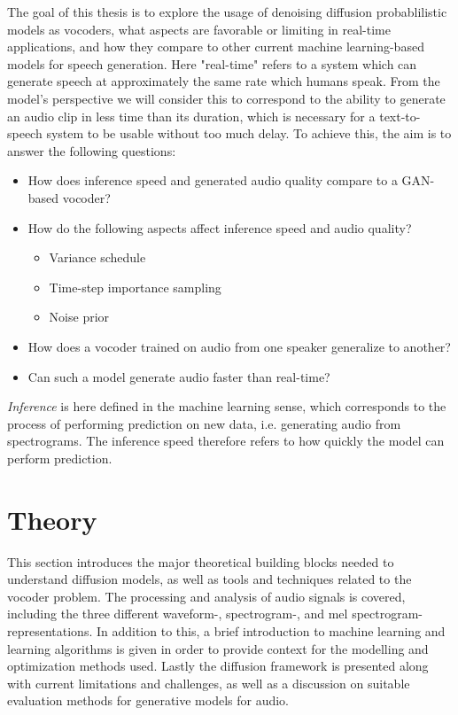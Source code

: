 \documentclass{report}
\begin{document}
The goal of this thesis is to explore the usage of denoising diffusion probablilistic models as vocoders, what aspects are favorable or limiting in real-time applications, and how they compare to other current machine learning-based models for speech generation. Here "real-time" refers to a system which can generate speech at approximately the same rate which humans speak. From the model's perspective we will consider this to correspond to the ability to generate an audio clip in less time than its duration, which is necessary for a text-to-speech system to be usable without too much delay. To achieve this, the aim is to answer the following questions:

\begin{itemize}
    \item How does inference speed and generated audio quality compare to a GAN-based vocoder?
    \item How do the following aspects affect inference speed and audio quality?
    \begin{itemize}
        \item Variance schedule
        \item Time-step importance sampling
        \item Noise prior
    \end{itemize}
    \item How does a vocoder trained on audio from one speaker generalize to another?
    \item Can such a model generate audio faster than real-time?
\end{itemize}

\textit{Inference} is here defined in the machine learning sense, which corresponds to the process of performing prediction on new data, i.e. generating audio from spectrograms. The inference speed therefore refers to how quickly the model can perform prediction.

\newpage
\chapter{Theory}

This section introduces the major theoretical building blocks needed to understand diffusion models, as well as tools and techniques related to the vocoder problem. The processing and analysis of audio signals is covered, including the three different waveform-, spectrogram-, and mel spectrogram-representations. In addition to this, a brief introduction to machine learning and learning algorithms is given in order to provide context for the modelling and optimization methods used. Lastly the diffusion framework is presented along with current limitations and challenges, as well as a discussion on suitable evaluation methods for generative models for audio.
\end{document}
